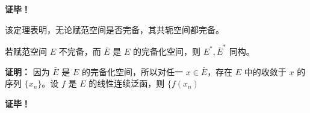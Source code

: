 \textbf{证毕！}

该定理表明，无论赋范空间是否完备，其共轭空间都完备。

\begin{theorem}{}
若赋范空间 $E$ 不完备，而 $\bar{E}$ 是 $E$ 的完备化空间，则 $E^*,\bar{E}^*$ 同构。
\end{theorem}

\textbf{证明：} 因为 $\bar{E}$ 是 $E$ 的完备化空间，所以对任一 $x\in \bar{E}$，存在 $E$ 中的收敛于 $x$ 的序列 $\{x_n\}$。设 $f$ 是 $E$ 的线性连续泛函，则 $\{f(x_n)$


\textbf{证毕！}



